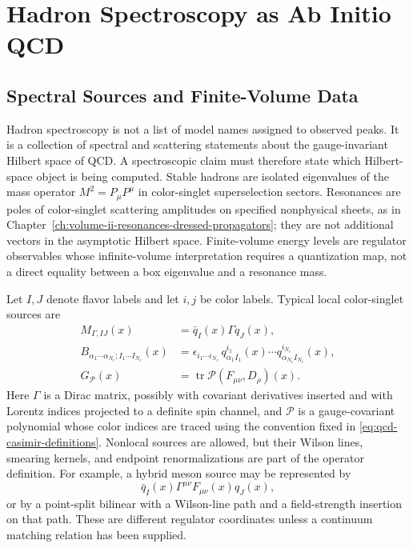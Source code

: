 \section{Hadron Spectroscopy as Ab Initio QCD}
\label{sec:qcd-hadron-spectroscopy-ab-initio}

\subsection{Spectral Sources and Finite-Volume Data}
\label{subsec:qcd-spectroscopy-sources-finite-volume}

Hadron spectroscopy is not a list of model names assigned to observed peaks.
It is a collection of spectral and scattering statements about the
gauge-invariant Hilbert space of QCD.  A spectroscopic claim must therefore
state which Hilbert-space object is being computed.  Stable hadrons are
isolated eigenvalues of the mass operator \(M^2=P_\mu P^\mu\) in color-singlet
superselection sectors.  Resonances are poles of color-singlet scattering
amplitudes on specified nonphysical sheets, as in
Chapter~\ref{ch:volume-ii-resonances-dressed-propagators}; they are not
additional vectors in the asymptotic Hilbert space.  Finite-volume energy
levels are regulator observables whose infinite-volume interpretation requires
a quantization map, not a direct equality between a box eigenvalue and a
resonance mass.

Let \(I,J\) denote flavor labels and let \(i,j\) be color labels.  Typical
local color-singlet sources are
\begin{align}
  M_{\Gamma,IJ}(x)
  &=
  \bar q_I(x)\Gamma q_J(x),
  \label{eq:qcd-meson-local-source}\\
  B_{\alpha_1\cdots\alpha_{N_c};I_1\cdots I_{N_c}}(x)
  &=
  \epsilon_{i_1\cdots i_{N_c}}\,
  q^{i_1}_{\alpha_1 I_1}(x)\cdots
  q^{i_{N_c}}_{\alpha_{N_c} I_{N_c}}(x),
  \label{eq:qcd-baryon-local-source}\\
  G_{\mathcal P}(x)
  &=
  \operatorname{tr}\mathcal P(F_{\mu\nu},D_\rho)(x).
  \label{eq:qcd-glueball-local-source}
\end{align}
Here \(\Gamma\) is a Dirac matrix, possibly with covariant derivatives
inserted and with Lorentz indices projected to a definite spin channel, and
\(\mathcal P\) is a gauge-covariant polynomial whose color indices are traced
using the convention fixed in \eqref{eq:qcd-casimir-definitions}.  Nonlocal
sources are allowed, but their Wilson lines, smearing kernels, and endpoint
renormalizations are part of the operator definition.  For example, a hybrid
meson source may be represented by
\[
  \bar q_I(x)\Gamma^{\mu\nu} F_{\mu\nu}(x) q_J(x),
\]
or by a point-split bilinear with a Wilson-line path and a field-strength
insertion on that path.  These are different regulator coordinates unless a
continuum matching relation has been supplied.

